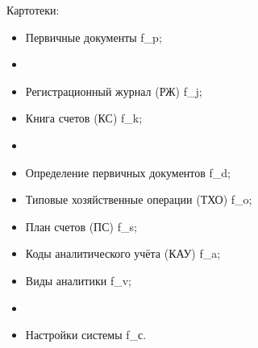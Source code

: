 Картотеки:

\begin{itemize}
    \item Первичные документы \gpiFIO\/f\_p;
    \item[]\hspace{0pt}
    \item Регистрационный журнал (РЖ) \gpiFIO\/f\_j;
    \item Книга счетов (КС) \gpiFIO\/f\_k;
    \item[]\hspace{0pt}
    \item Определение первичных документов \gpiFIO\/f\_d;
    \item Типовые хозяйственные операции (ТХО) \gpiFIO\/f\_o;
    \item План счетов (ПС) \gpiFIO\/f\_s;
    \item Коды аналитического учёта (КАУ) \gpiFIO\/f\_a;
    \item Виды аналитики \gpiFIO\/f\_v;
    \item[]\hspace{0pt}
    \item Настройки системы \gpiFIO\/f\_с. 
\end{itemize}

